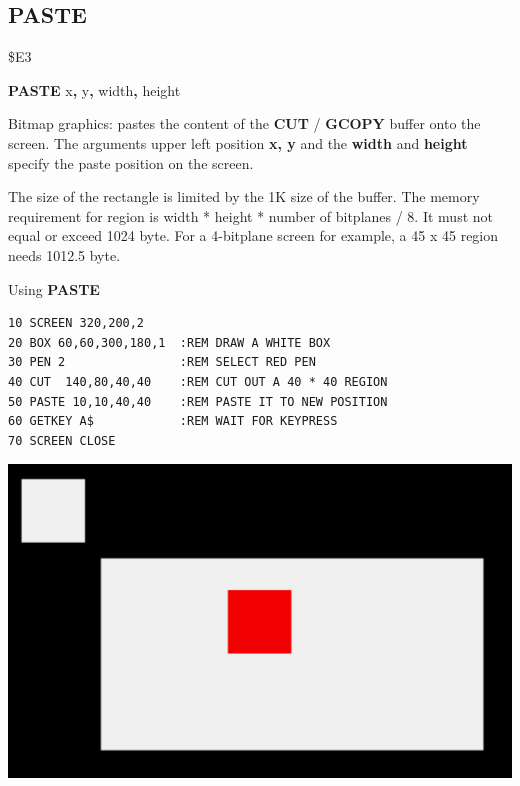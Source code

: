 \subsection{PASTE}
\begin{description}[leftmargin=2cm,style=nextline]
\item [Token:] \$E3
\item [Format:] {\bf PASTE} x{\bf,} y{\bf,} width{\bf,} height
\item [Usage:] Bitmap graphics: pastes the content
               of the {\bf CUT} / {\bf GCOPY} buffer onto the screen.
               The arguments upper left position {\bf x, y} and the {\bf width}
               and {\bf height} specify the paste position on the screen.

\item [Remarks:] The size of the rectangle is limited by the 1K size of
                 the buffer. The memory requirement for
                 region is width * height * number of bitplanes / 8.
                 It must not equal or exceed 1024 byte.
                 For a 4-bitplane screen for example, a 45 x 45 region
                 needs 1012.5 byte.

\item [Example:] Using {\bf PASTE}
\begin{tcolorbox}[colback=black,coltext=white]
\verbatimfont{\codefont}
\begin{verbatim}
10 SCREEN 320,200,2
20 BOX 60,60,300,180,1  :REM DRAW A WHITE BOX
30 PEN 2                :REM SELECT RED PEN
40 CUT  140,80,40,40    :REM CUT OUT A 40 * 40 REGION
50 PASTE 10,10,40,40    :REM PASTE IT TO NEW POSITION
60 GETKEY A$            :REM WAIT FOR KEYPRESS
70 SCREEN CLOSE
\end{verbatim}
\end{tcolorbox}
\item \begin{center}\includegraphics[width=0.7\linewidth]{images/cut.png}\end{center}
\end{description}

